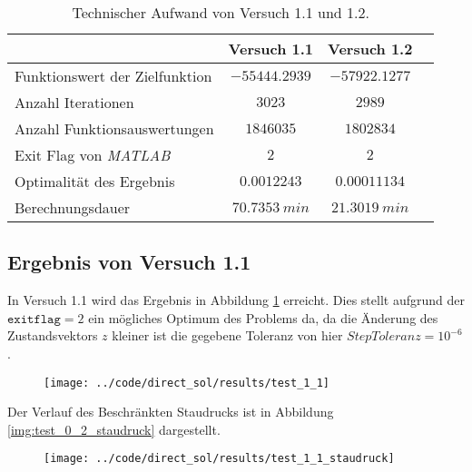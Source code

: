 \begin{table}[H]
    \centering
    \caption{Technischer Aufwand von Versuch 1.1 und 1.2.}\label{tab:Versuch1_TA}
    \begin{tabularx}{.9\textwidth}{Zccc}
        \toprule
         & \textbf{Versuch 1.1} & \textbf{Versuch 1.2} \\
        \midrule
        Funktionswert der Zielfunktion & $-55444.2939$ & $-57922.1277$ \\
        Anzahl Iterationen & $3023$ & $2989$ \\
        Anzahl Funktionsauswertungen & $1846035$ & $1802834$ \\
        Exit Flag von \textit{MATLAB} & $2$ & $2$ \\
        Optimalität des Ergebnis & $0.0012243$ & $0.00011134$ \\
        Berechnungsdauer & $70.7353 \ min$ & $21.3019 \ min$ \\
        \bottomrule
    \end{tabularx}
\end{table}




\subsection{Ergebnis von Versuch 1.1}\label{kap:Versuch11}
In Versuch 1.1 wird das Ergebnis in Abbildung \ref{img:test_1_1} erreicht. Dies stellt aufgrund der $\texttt{exitflag} = 2$ ein mögliches Optimum des Problems da, da die Änderung des Zustandsvektors $z$ kleiner ist die gegebene Toleranz von hier $StepToleranz = 10^{-6}$.
\begin{figure}[H]
\begin{center}
\texttt{[image: ../code/direct\_sol/results/test\_1\_1]}
 \label{img:test_1_1}
\end{center}
\end{figure}
Der Verlauf des Beschränkten Staudrucks ist in Abbildung \ref{img:test_0_2_staudruck} dargestellt.
\begin{figure}[H]
\begin{center}
\texttt{[image: ../code/direct\_sol/results/test\_1\_1\_staudruck]}
\label{img:test_1_1_staudruck}
\end{center}
\end{figure}




